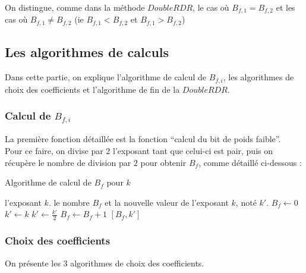 \documentclass[12pt, a4paper]{memoir}
\begin{document}
On distingue, comme dans la méthode $DoubleRDR$, le cas où $B_{f,1} = B_{f,2}$ et les cas où $B_{f,1} \neq B_{f,2}$
(ie $B_{f,1} < B_{f,2}$ et $B_{f,1} > B_{f,2}$)

\subsection{Les algorithmes de calculs}

Dans cette partie, on explique l'algorithme de calcul de $B_{f,i}$, les algorithmes de choix des coefficients
et l'algorithme de fin de la $DoubleRDR$.

\subsubsection{Calcul de $B_{f,i}$}

La première fonction détaillée est la fonction ``calcul du bit de poids faible''. \\
Pour ce faire, on divise par $2$ l'exposant tant que celui-ci est pair, puis on récupère le nombre de division par $2$
pour obtenir $B_f$, comme détaillé ci-dessous :

\begin{algorithm}
 \caption{Algorithme de calcul de $B_f$ pour $k$}
 \begin{algorithmic}
  \REQUIRE l'exposant $k$.
  \ENSURE le nombre $B_f$ et la nouvelle valeur de l'exposant $k$, noté $k'$.
  \STATE $B_f \leftarrow 0$
  \STATE $k' \leftarrow k$
  \STATE $k' \leftarrow \frac{k'}{2}$
  \STATE $B_f \leftarrow B_f + 1$
  \ENDWHILE
  \RETURN $[B_f,k']$
 \end{algorithmic}
\end{algorithm}

\subsubsection{Choix des coefficients}

On présente les $3$ algorithmes de choix des coefficients.
\end{document}
